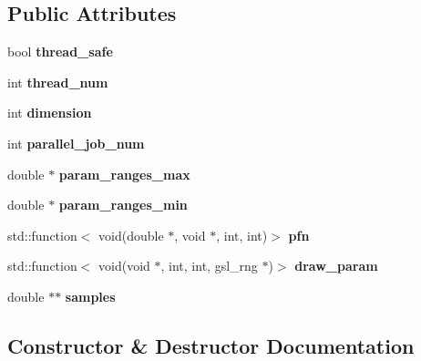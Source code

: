 \subsection*{Public Attributes}
\begin{DoxyCompactItemize}
\item 
\mbox{\label{classmcr__sampler_a8ea0db12646c21e02f99a22e8c69f287}} 
bool {\bfseries thread\+\_\+safe}
\item 
\mbox{\label{classmcr__sampler_a01cdfa4fd6116570b83bf9c00dffb4f2}} 
int {\bfseries thread\+\_\+num}
\item 
\mbox{\label{classmcr__sampler_a6316178e63a7e2fd07c3cc74b14a986d}} 
int {\bfseries dimension}
\item 
\mbox{\label{classmcr__sampler_af8f92c143d75d35fae0714ec955b81b9}} 
int {\bfseries parallel\+\_\+job\+\_\+num}
\item 
\mbox{\label{classmcr__sampler_a962ef98523fcd354b538175f335baf58}} 
double $\ast$ {\bfseries param\+\_\+ranges\+\_\+max}
\item 
\mbox{\label{classmcr__sampler_a99855b66f70b2fbea2458aa4046088e8}} 
double $\ast$ {\bfseries param\+\_\+ranges\+\_\+min}
\item 
\mbox{\label{classmcr__sampler_ad87f2d7738158ed37629c34336b0aa60}} 
std\+::function$<$ void(double $\ast$, void $\ast$, int, int)$>$ {\bfseries pfn}
\item 
\mbox{\label{classmcr__sampler_a48e9c96d43b1bb2cf912383cf642f3a7}} 
std\+::function$<$ void(void $\ast$, int, int, gsl\+\_\+rng $\ast$)$>$ {\bfseries draw\+\_\+param}
\item 
\mbox{\label{classmcr__sampler_aedb26b1163d8705bf64af08867a72d20}} 
double $\ast$$\ast$ {\bfseries samples}
\end{DoxyCompactItemize}


\subsection{Constructor \& Destructor Documentation}
\mbox{\label{classmcr__sampler_a9f9da59f2b90a771e1fcd659aedbf920}} 
